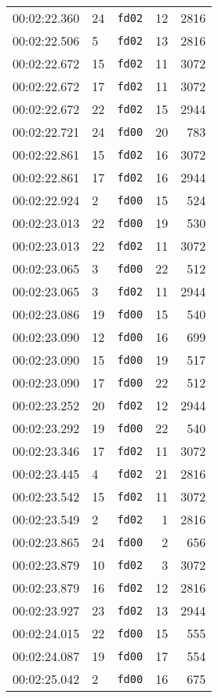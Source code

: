 \documentclass{article}
\begin{document}
\begin{longtable}{lllrr}
00:02:22.360 & 24 & \texttt{fd02} & 12 & 2816 \\
00:02:22.506 & 5 & \texttt{fd02} & 13 & 2816 \\
00:02:22.672 & 15 & \texttt{fd02} & 11 & 3072 \\
00:02:22.672 & 17 & \texttt{fd02} & 11 & 3072 \\
00:02:22.672 & 22 & \texttt{fd02} & 15 & 2944 \\
00:02:22.721 & 24 & \texttt{fd00} & 20 & 783 \\
00:02:22.861 & 15 & \texttt{fd02} & 16 & 3072 \\
00:02:22.861 & 17 & \texttt{fd02} & 16 & 2944 \\
00:02:22.924 & 2 & \texttt{fd00} & 15 & 524 \\
00:02:23.013 & 22 & \texttt{fd00} & 19 & 530 \\
00:02:23.013 & 22 & \texttt{fd02} & 11 & 3072 \\
00:02:23.065 & 3 & \texttt{fd00} & 22 & 512 \\
00:02:23.065 & 3 & \texttt{fd02} & 11 & 2944 \\
00:02:23.086 & 19 & \texttt{fd00} & 15 & 540 \\
00:02:23.090 & 12 & \texttt{fd00} & 16 & 699 \\
00:02:23.090 & 15 & \texttt{fd00} & 19 & 517 \\
00:02:23.090 & 17 & \texttt{fd00} & 22 & 512 \\
00:02:23.252 & 20 & \texttt{fd02} & 12 & 2944 \\
00:02:23.292 & 19 & \texttt{fd00} & 22 & 540 \\
00:02:23.346 & 17 & \texttt{fd02} & 11 & 3072 \\
00:02:23.445 & 4 & \texttt{fd02} & 21 & 2816 \\
00:02:23.542 & 15 & \texttt{fd02} & 11 & 3072 \\
00:02:23.549 & 2 & \texttt{fd02} & 1 & 2816 \\
00:02:23.865 & 24 & \texttt{fd00} & 2 & 656 \\
00:02:23.879 & 10 & \texttt{fd02} & 3 & 3072 \\
00:02:23.879 & 16 & \texttt{fd02} & 12 & 2816 \\
00:02:23.927 & 23 & \texttt{fd02} & 13 & 2944 \\
00:02:24.015 & 22 & \texttt{fd00} & 15 & 555 \\
00:02:24.087 & 19 & \texttt{fd00} & 17 & 554 \\
00:02:25.042 & 2 & \texttt{fd00} & 16 & 675 \\

\end{longtable}
\end{document}
